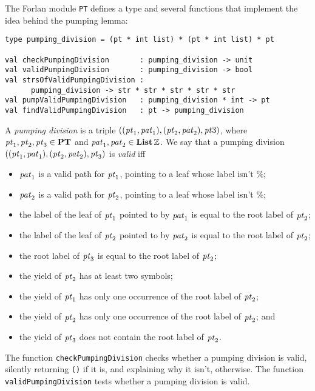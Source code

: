 %
The Forlan module \texttt{PT} defines a type and several functions
that implement the idea behind the pumping lemma:
\begin{verbatim}
type pumping_division = (pt * int list) * (pt * int list) * pt

val checkPumpingDivision       : pumping_division -> unit
val validPumpingDivision       : pumping_division -> bool
val strsOfValidPumpingDivision :
      pumping_division -> str * str * str * str * str
val pumpValidPumpingDivision   : pumping_division * int -> pt
val findValidPumpingDivision   : pt -> pumping_division
\end{verbatim}
%
%
%
%
%
%
A \emph{pumping division} is a triple $(({\it pt}_1, {\it pat}_1), ({\it pt}_2,
{\it pat}_2), {\it pt}3)$, where ${\it pt}_1, {\it pt}_2, {\it pt}_3\in\mathbf{PT}$ and ${\it pat}_1,
{\it pat}_2\in\mathbf{List}\,\mathbb{Z}$.  We say that a pumping division $(({\it pt}_1,
{\it pat}_1), ({\it pt}_2, {\it pat}_2), {\it pt}_3)$ is \emph{valid} iff
\begin{itemize}
\item ${\it pat}_1$ is a valid path for ${\it pt}_1$, pointing to a leaf whose
  label isn't $\%$;

\item ${\it pat}_2$ is a valid path for ${\it pt}_2$, pointing to a leaf whose
  label isn't $\%$;

\item the label of the leaf of ${\it pt}_1$ pointed to by ${\it pat}_1$ is equal
  to the root label of ${\it pt}_2$;

\item the label of the leaf of ${\it pt}_2$ pointed to by ${\it pat}_2$ is equal
  to the root label of ${\it pt}_2$;

\item the root label of ${\it pt}_3$ is equal to the root label of ${\it pt}_2$;

\item the yield of ${\it pt}_2$ has at least two symbols;

\item the yield of ${\it pt}_1$ has only one occurrence of the root label
  of ${\it pt}_2$;

\item the yield of ${\it pt}_2$ has only one occurrence of the root label
  of ${\it pt}_2$; and

\item the yield of ${\it pt}_3$ does not contain the root label of ${\it pt}_2$.
\end{itemize}
The function \texttt{checkPumpingDivision} checks whether a pumping division
is valid, silently returning \texttt{()} if it is, and explaining why
it isn't, otherwise.  The function \texttt{validPumpingDivision} tests
whether a pumping division is valid.


